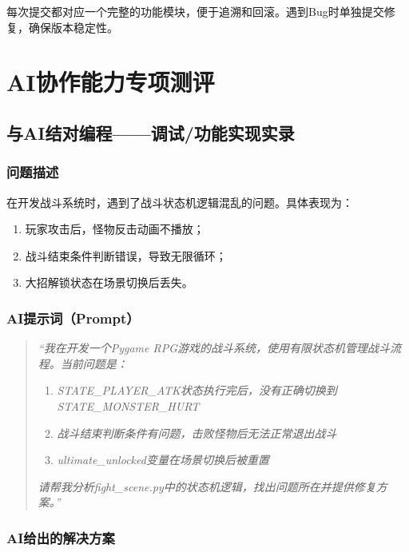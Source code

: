 \documentclass[a4paper,12pt]{article}
\begin{document}
每次提交都对应一个完整的功能模块，便于追溯和回滚。遇到Bug时单独提交修复，确保版本稳定性。

\section{AI协作能力专项测评}

\subsection{与AI结对编程——调试/功能实现实录}

\subsubsection{问题描述}

在开发战斗系统时，遇到了战斗状态机逻辑混乱的问题。具体表现为：

\begin{enumerate}[label=(\arabic*)]
    \item 玩家攻击后，怪物反击动画不播放；
    \item 战斗结束条件判断错误，导致无限循环；
    \item 大招解锁状态在场景切换后丢失。
\end{enumerate}

\subsubsection{AI提示词（Prompt）}

\begin{quote}
\textit{``我在开发一个Pygame RPG游戏的战斗系统，使用有限状态机管理战斗流程。当前问题是：}
\begin{enumerate}[label=(\arabic*)]
    \item \textit{STATE\_PLAYER\_ATK状态执行完后，没有正确切换到STATE\_MONSTER\_HURT}
    \item \textit{战斗结束判断条件有问题，击败怪物后无法正常退出战斗}
    \item \textit{ultimate\_unlocked变量在场景切换后被重置}
\end{enumerate}
\textit{请帮我分析fight\_scene.py中的状态机逻辑，找出问题所在并提供修复方案。''}
\end{quote}

\subsubsection{AI给出的解决方案}
\end{document}

